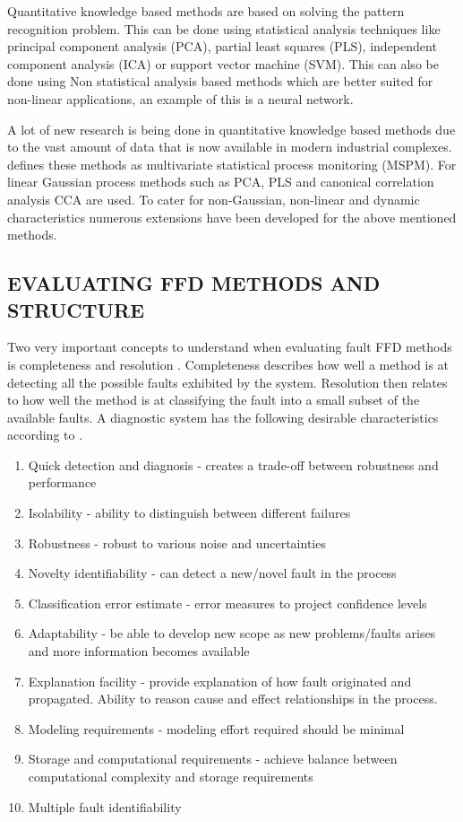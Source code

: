 Quantitative knowledge based methods are based on solving the pattern recognition problem. This can be done using statistical analysis techniques like principal component analysis (PCA), partial least squares (PLS), independent component analysis (ICA) or support vector machine (SVM). This can also be done using Non statistical analysis based methods which are better suited for non-linear applications, an example of this is a neural network.

A lot of new research is being done in quantitative knowledge based methods due to the vast amount of data that is now available in modern industrial complexes. \cite{jiang2019review} defines these methods as multivariate statistical process monitoring (MSPM). For linear Gaussian process methods such as PCA, PLS and canonical correlation analysis CCA are used. To cater for non-Gaussian, non-linear and dynamic characteristics numerous extensions have been developed for the above mentioned methods.

\subsection{EVALUATING FFD METHODS AND STRUCTURE}

Two very important concepts to understand when evaluating fault FFD methods is completeness and resolution \cite{venkatasubramanian2003review}. Completeness describes how well a method is at detecting all the possible faults exhibited by the system. Resolution then relates to how well the method is at classifying the fault into a small subset of the available faults. A diagnostic system has the following desirable characteristics according to \cite{venkatasubramanian2003review}.
\begin{enumerate}
	\item Quick detection and diagnosis - creates a trade-off between robustness and performance
	\item Isolability - ability to distinguish between different failures
	\item Robustness - robust to various noise and uncertainties
	\item Novelty identifiability - can detect a new/novel fault in the process
	\item Classification error estimate - error measures to project confidence levels
	\item Adaptability - be able to develop new scope as new problems/faults arises and more information becomes available
	\item Explanation facility - provide explanation of how fault originated and propagated. Ability to reason cause and effect relationships in the process.
	\item Modeling requirements - modeling effort required should be minimal
	\item Storage and computational requirements - achieve balance between computational complexity and storage requirements
	\item Multiple fault identifiability	
\end{enumerate}

